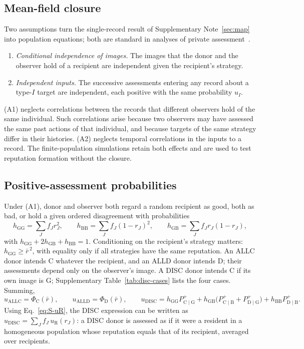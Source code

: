 \documentclass[fleqn,10pt]{article}
\theoremstyle{plain}
\theoremstyle{remark}
\newcommand{\G}{\mathrm G}
\newcommand{\B}{\mathrm B}
\newcommand{\C}{\mathrm C}
\newcommand{\D}{\mathrm D}
\newcommand{\ALLC}{\mathrm{ALLC}}
\newcommand{\ALLD}{\mathrm{ALLD}}
\newcommand{\DISC}{\mathrm{DISC}}
\newcommand{\Pp}[2]{P^+_{\mathrm{#1}\mid\mathrm{#2}}}
\begin{document}
\subsection{Mean-field closure}
Two assumptions turn the single-record result of Supplementary
Note~\ref{sec:map} into population equations; both are standard in analyses
of private assessment~\cite{okada2018,radzvilavicius2019,kessinger2023,michelmata2024,kawakatsu2024}.
\begin{enumerate}
\item[(A1)] \emph{Conditional independence of images.} The images that the donor
and the observer hold of a recipient are independent given the recipient's
strategy.
\item[(A2)] \emph{Independent inputs.} The successive assessments entering any
record about a type-$I$ target are independent, each positive with the same
probability $u_I$.
\end{enumerate}
(A1) neglects correlations between the records that different observers hold
of the same individual. Such correlations arise because two observers may have
assessed the same past actions of that individual, and because targets of the
same strategy differ in their histories. (A2) neglects temporal correlations
in the inputs to a record. The finite-population simulations retain both
effects and are used to test reputation formation without the closure.

\subsection{Positive-assessment probabilities}
Under (A1), donor and observer both regard a random recipient as good, both as
bad, or hold a given ordered disagreement with probabilities
\begin{equation}
h_{\G\G}=\sum_Jf_Jr_J^2,\qquad
h_{\B\B}=\sum_Jf_J(1-r_J)^2,\qquad
h_{\G\B}=\sum_Jf_Jr_J(1-r_J),
\label{eq:S-pairs}
\end{equation}
with $h_{\G\G}+2h_{\G\B}+h_{\B\B}=1$. Conditioning on the recipient's strategy
matters: $h_{\G\G}\ge\bar r^{\,2}$, with equality only if all strategies have the
same reputation. An ALLC donor intends $\C$ whatever the recipient, and an ALLD
donor intends $\D$; their assessments depend only on the observer's image.
A DISC donor intends $\C$ if its own image is $\G$; Supplementary
Table~\ref{tab:disc-cases} lists the four cases. Summing,
\begin{equation}
u_{\ALLC}=\Phi_\C(\bar r),\qquad u_{\ALLD}=\Phi_\D(\bar r),\qquad
u_{\DISC}=h_{\G\G}\Pp CG+h_{\G\B}\bigl(\Pp CB+\Pp DG\bigr)+h_{\B\B}\Pp DB .
\label{eq:S-u}
\end{equation}
Using Eq.~\eqref{eq:S-uR}, the DISC expression can be written as
$u_{\DISC}=\sum_Jf_J\,u_{\mathrm R}(r_J)$: a DISC donor is assessed as if it were
a resident in a homogeneous population whose reputation equals that of its
recipient, averaged over recipients.
\end{document}
